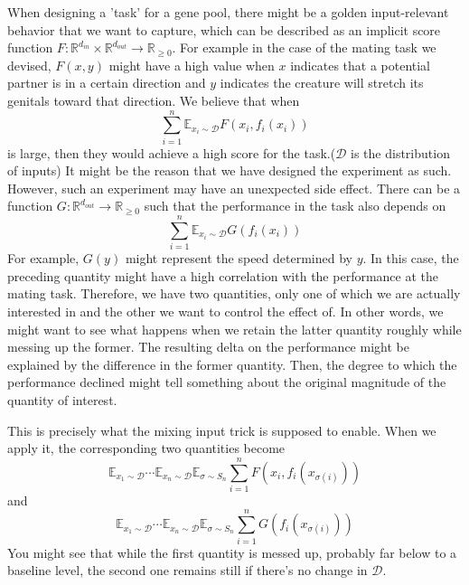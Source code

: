 \documentclass{amsart}
\theoremstyle{definition}
\theoremstyle{remark}
\numberwithin{equation}{section}
\begin{document}
When designing a 'task' for a gene pool, there might be a golden input-relevant behavior that we want to capture,  which can be described as an implicit score function $F:\mathbb{R}^{d_{in}}\times\mathbb{R}^{d_{out}}\to\mathbb{R}_{\ge 0}$. For example in the case of the mating task we devised, $F(x,y)$ might have a high value when $x$ indicates that a potential partner is in a certain direction and $y$  indicates the creature will stretch its genitals toward that direction. We believe that when 
\begin{equation*}
\sum_{i=1}^{n}\mathbb{E}_{x_i\sim \mathcal{D}}F(x_i,f_i(x_i))
\end{equation*}
 is large, then they would achieve a high score for the task.($\mathcal{D}$ is the distribution of inputs) It might be the reason that we have designed the experiment as such. However, such an experiment may have an unexpected side effect. There can be a function $G:\mathbb{R}^{d_{out}}\to\mathbb{R}_{\ge 0}$ such that the performance in the task also depends on 
\begin{equation*}
\sum_{i=1}^{n}\mathbb{E}_{x_i\sim\mathcal{D}}G(f_i(x_i))
\end{equation*}  
For example, $G(y)$ might represent the speed determined by $y$. In this case, the preceding quantity might have a high correlation with the performance at the mating task. Therefore, we have two quantities, only one of which we are actually interested in and the other we want to control the effect of. In other words, we might want to see what happens when we retain the latter quantity roughly while messing up the former. The resulting delta on the performance might be explained by the difference in the former quantity. Then, the degree to which the performance declined might tell something about the original magnitude of the quantity of interest.


This is precisely what the mixing input trick is supposed to enable. When we apply it, the corresponding two quantities become
\begin{equation*}
\mathbb{E}_{x_1\sim\mathcal{D}}\cdots\mathbb{E}_{x_n\sim\mathcal{D}}\mathbb{E}_{\sigma\sim S_n} \sum_{i=1}^{n}F(x_i,f_i(x_{\sigma(i)}))
\end{equation*} 
and 
\begin{equation*}
\mathbb{E}_{x_1\sim\mathcal{D}}\cdots\mathbb{E}_{x_n\sim\mathcal{D}}\mathbb{E}_{\sigma\sim S_n} \sum_{i=1}^{n}G(f_i(x_{\sigma(i)}))
\end{equation*} 
You might see that while the first quantity is messed up, probably far below to a baseline level, the second one remains still if there's no change in $\mathcal{D}$. 
\end{document}
